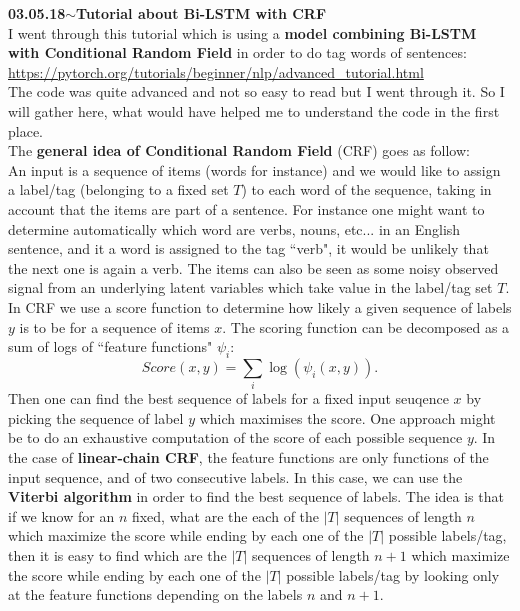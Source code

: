 \documentclass[11pt,a4paper]{article}
\newenvironment{loggentry}[2]%
{\noindent\textbf{#1}\hspace{1cm}$\mathbf{\sim}$\text{ }\textbf{#2}\\}{\vspace{0.5cm}}
\begin{document}
\begin{loggentry}{03.05.18}{Tutorial about Bi-LSTM with CRF}
I went through this tutorial which is using a \textbf{model combining Bi-LSTM with Conditional Random Field} in order to do tag words of sentences:\\
\url{https://pytorch.org/tutorials/beginner/nlp/advanced_tutorial.html}\\
The code was quite advanced and not so easy to read but I went through it. So I will gather here, what would have helped me to understand the code in the first place.\\
The \textbf{general idea of Conditional Random Field} (CRF) goes as follow:\\
An input is a sequence of items (words for instance) and we would like to assign a label/tag (belonging to a fixed set $T$) to each word of the sequence, taking in account that the items are part of a sentence. For instance one might want to determine automatically which word are verbs, nouns, etc... in an English sentence, and it a word is assigned to the tag ``verb", it would be unlikely that the next one is again a verb. The items can also be seen as some noisy observed signal from an underlying latent variables which take value in the label/tag set $T$. In CRF we use a score function to determine how likely a given sequence of labels $y$ is to be for a sequence of items $x$. The scoring function can be decomposed as a sum of logs of ``feature functions" $\psi_i$:
\begin{equation}\label{eq:CRF_score}
Score(x,y) = \sum_i \log(\psi_{i}(x,y)).
\end{equation}
Then one can find the best sequence of labels for a fixed input seuqence $x$ by picking the sequence of label $y$ which maximises the score. One approach might be to do an exhaustive computation of the score of each possible sequence $y$. In the case of \textbf{linear-chain CRF}, the feature functions are only functions of the input sequence, and of two consecutive labels. In this case, we can use the \textbf{Viterbi algorithm} in order to find the best sequence of labels. The idea is that if we know for an $n$ fixed, what are the each of the $|T|$ sequences of length $n$ which maximize the score while ending by each one of the $|T|$ possible labels/tag, then it is easy to find which are the $|T|$ sequences of length $n+1$ which maximize the score while ending by each one of the $|T|$ possible labels/tag by looking only at the feature functions depending on the labels $n$ and $n+1$.\\

\end{loggentry}
\end{document}
